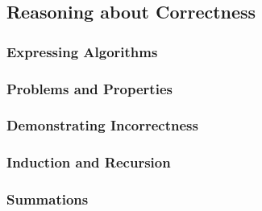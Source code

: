 \subsection{Reasoning about Correctness}

\subsubsection{Expressing Algorithms}

\subsubsection{Problems and Properties}

\subsubsection{Demonstrating Incorrectness}

\subsubsection{Induction and Recursion}

\subsubsection{Summations}